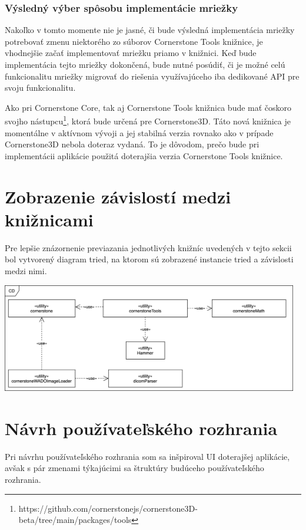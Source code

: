 \subsubsection {Výsledný výber spôsobu implementácie mriežky}
Nakoľko v tomto momente nie je jasné, či bude výsledná implementácia mriežky potrebovať zmenu niektorého zo súborov Cornerstone Tools knižnice, je vhodnejšie začať implementovať mriežku priamo v knižnici. Keď bude implementácia tejto mriežky dokončená, bude nutné posúdiť, či je možné celú funkcionalitu mriežky migrovať do riešenia využívajúceho iba dedikované API pre svoju funkcionalitu.

Ako pri Cornerstone Core, tak aj Cornerstone Tools knižnica bude mať čoskoro svojho nástupcu\footnote{https://github.com/cornerstonejs/cornerstone3D-beta/tree/main/packages/tools}, ktorá bude určená pre Cornerstone3D. Táto nová knižnica je momentálne v aktívnom vývoji a jej stabilná verzia rovnako ako v prípade Cornerstone3D nebola doteraz vydaná. To je dôvodom, prečo bude pri implementácii aplikácie použitá doterajšia verzia Cornerstone Tools knižnice.

\section {Zobrazenie závislostí medzi knižnicami}\label{dependency_graph}
Pre lepšie znázornenie previazania jednotlivých knižníc uvedených v tejto sekcii bol vytvorený diagram tried, na ktorom sú zobrazené instancie tried a závislosti medzi nimi.

\begin {center}
        \centering
        \includegraphics[height=4.75cm]{media/graphs/class_diagram.png}
        \captionsetup{justification=centering}
\end {center}

\clearpage

\section {Návrh používateľského rozhrania}
Pri návrhu používateľského rozhrania som sa inšpiroval UI doterajšej aplikácie, avšak s pár zmenami týkajúcimi sa štruktúry budúceho používateľského rozhrania.

